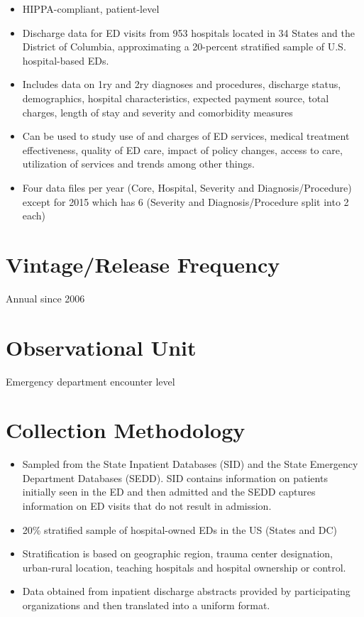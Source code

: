 \documentclass[
]{book}
\providecommand{\tightlist}{%
  \setlength{\itemsep}{0pt}\setlength{\parskip}{0pt}}
\begin{document}
\begin{itemize}
\tightlist
\item
  HIPPA-compliant, patient-level
\item
  Discharge data for ED visits from 953 hospitals located in 34 States and the District of Columbia, approximating a 20-percent stratified sample of U.S. hospital-based EDs.
\item
  Includes data on 1ry and 2ry diagnoses and procedures, discharge status, demographics, hospital characteristics, expected payment source, total charges, length of stay and severity and comorbidity measures
\item
  Can be used to study use of and charges of ED services, medical treatment effectiveness, quality of ED care, impact of policy changes, access to care, utilization of services and trends among other things.
\item
  Four data files per year (Core, Hospital, Severity and Diagnosis/Procedure) except for 2015 which has 6 (Severity and Diagnosis/Procedure split into 2 each)
\end{itemize}

\hypertarget{vintagerelease-frequency-69}{%
\section{Vintage/Release Frequency}\label{vintagerelease-frequency-69}}

Annual since 2006

\hypertarget{observational-unit-69}{%
\section{Observational Unit}\label{observational-unit-69}}

Emergency department encounter level

\hypertarget{collection-methodology-69}{%
\section{Collection Methodology}\label{collection-methodology-69}}

\begin{itemize}
\tightlist
\item
  Sampled from the State Inpatient Databases (SID) and the State Emergency Department Databases (SEDD). SID contains information on patients initially seen in the ED and then admitted and the SEDD captures information on ED visits that do not result in admission.
\item
  20\% stratified sample of hospital-owned EDs in the US (States and DC)
\item
  Stratification is based on geographic region, trauma center designation, urban-rural location, teaching hospitals and hospital ownership or control.
\item
  Data obtained from inpatient discharge abstracts provided by participating organizations and then translated into a uniform format.
\end{itemize}
\end{document}
